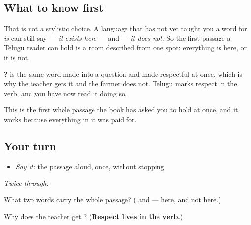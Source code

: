 \subsection*{What to know first}
That is not a stylistic choice. A language that has not yet taught you a word for \emph{is} can still say \textbf{} — \emph{it exists here} — and \textbf{} — \emph{it does not}. So the first passage a Telugu reader can hold is a room described from one spot: everything is here, or it is not.

\textbf{?} is the same word made into a question and made respectful at once, which is why the teacher gets it and the farmer does not. Telugu marks respect in the verb, and you have now read it doing so.

This is the first whole passage the book has asked you to hold at once, and it works because everything in it was paid for.

\subsection*{Your turn}
\begin{itemize}
\raggedright
  \item \emph{Say it:} the passage aloud, once, without stopping
\end{itemize}

\emph{Twice through:}

\begin{tcolorbox}[breakable,colback=teal!4,colframe=teal!35!black,title={Before you move on}]
What two words carry the whole passage? (\textbf{} and \textbf{} — here, and not here.)

Why does the teacher get \textbf{}? (\textbf{Respect lives in the verb.})
\end{tcolorbox}
